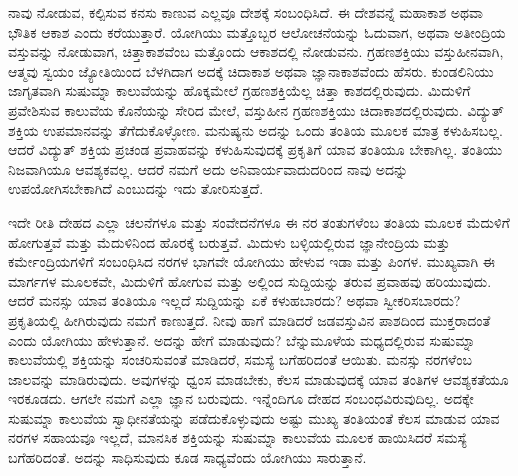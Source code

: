 \vskip 6pt

ನಾವು ನೋಡುವ, ಕಲ್ಪಿಸುವ ಕನಸು ಕಾಣುವ ಎಲ್ಲವೂ ದೇಶಕ್ಕೆ ಸಂಬಂಧಿಸಿದೆ. ಈ ದೇಶವನ್ನೆ ಮಹಾಕಾಶ ಅಥವಾ ಭೌತಿಕ ಆಕಾಶ ಎಂದು ಕರೆಯುತ್ತಾರೆ. ಯೋಗಿಯು ಮತ್ತೊಬ್ಬರ ಆಲೋಚನೆಯನ್ನು ಓದುವಾಗ, ಅಥವಾ ಅತೀಂದ್ರಿಯ ವಸ್ತುವನ್ನು ನೋಡುವಾಗ, ಚಿತ್ತಾಕಾಶವೆಂಬ ಮತ್ತೊಂದು ಆಕಾಶದಲ್ಲಿ ನೋಡುವನು. ಗ್ರಹಣಶಕ್ತಿಯು ವಸ್ತುಹೀನವಾಗಿ, ಆತ್ಮವು ಸ್ವಯಂ ಜ್ಯೋತಿಯಿಂದ ಬೆಳಗಿದಾಗ ಅದಕ್ಕೆ ಚಿದಾಕಾಶ ಅಥವಾ ಜ್ಞಾನಾಕಾಶವೆಂದು ಹೆಸರು. ಕುಂಡಲಿನಿಯು ಜಾಗೃತವಾಗಿ ಸುಷುಮ್ನಾ ಕಾಲುವೆಯನ್ನು ಹೊಕ್ಕಮೇಲೆ ಗ್ರಹಣಶಕ್ತಿಯೆಲ್ಲ ಚಿತ್ತಾ ಕಾಶದಲ್ಲಿರುವುದು. ಮಿದುಳಿಗೆ ಪ್ರವೇಶಿಸುವ ಕಾಲುವೆಯ ಕೊನೆಯನ್ನು ಸೇರಿದ ಮೇಲೆ, ವಸ್ತುಹೀನ ಗ್ರಹಣಶಕ್ತಿಯು  ಚಿದಾಕಾಶದಲ್ಲಿರುವುದು. ವಿದ್ಯುತ್​ಶಕ್ತಿಯ ಉಪಮಾನವನ್ನು ತೆಗೆದುಕೊಳ್ಳೋಣ. ಮನುಷ್ಯನು ಅದನ್ನು ಒಂದು ತಂತಿಯ ಮೂಲಕ ಮಾತ್ರ ಕಳುಹಿಸಬಲ್ಲ. ಆದರೆ ವಿದ್ಯುತ್​ ಶಕ್ತಿಯ ಪ್ರಚಂಡ ಪ್ರವಾಹವನ್ನು ಕಳುಹಿಸುವುದಕ್ಕೆ ಪ್ರಕೃತಿಗೆ ಯಾವ ತಂತಿಯೂ ಬೇಕಾಗಿಲ್ಲ. ತಂತಿಯು ನಿಜವಾಗಿಯೂ ಆವಶ್ಯಕವಲ್ಲ. ಆದರೆ ನಮಗೆ ಅದು ಅನಿವಾರ್ಯವಾದುದರಿಂದ ನಾವು ಅದನ್ನು ಉಪಯೋಗಿಸಬೇಕಾಗಿದೆ ಎಂಬುದನ್ನು ಇದು ತೋರಿಸುತ್ತದೆ. 

\vskip 6pt

ಇದೇ ರೀತಿ ದೇಹದ ಎಲ್ಲಾ ಚಲನೆಗಳೂ ಮತ್ತು ಸಂವೇದನೆಗಳೂ ಈ ನರ ತಂತುಗಳೆಂಬ ತಂತಿಯ ಮೂಲಕ ಮೆದುಳಿಗೆ ಹೋಗುತ್ತವೆ ಮತ್ತು ಮೆದುಳಿನಿಂದ ಹೊರಕ್ಕೆ ಬರುತ್ತವೆ. ಮಿದುಳು ಬಳ್ಳಿಯಲ್ಲಿರುವ ಜ್ಞಾನೇಂದ್ರಿಯ ಮತ್ತು ಕರ್ಮೇಂದ್ರಿಯಗಳಿಗೆ ಸಂಬಂಧಿಸಿದ ನರಗಳ ಭಾಗವೇ ಯೋಗಿಯು ಹೇಳುವ ಇಡಾ ಮತ್ತು ಪಿಂಗಳ. ಮುಖ್ಯವಾಗಿ ಈ ಮಾರ್ಗಗಳ ಮೂಲಕವೇ, ಮಿದುಳಿಗೆ ಹೋಗುವ ಮತ್ತು ಅಲ್ಲಿಂದ ಸುದ್ದಿಯನ್ನು ತರುವ ಪ್ರವಾಹವು ಹರಿಯುವುದು. ಆದರೆ ಮನಸ್ಸು ಯಾವ ತಂತಿಯೂ ಇಲ್ಲದೆ ಸುದ್ದಿಯನ್ನು ಏಕೆ ಕಳುಹಬಾರದು? ಅಥವಾ ಸ್ವೀಕರಿಸಬಾರದು? ಪ್ರಕೃತಿಯಲ್ಲಿ ಹೀಗಿರುವುದು ನಮಗೆ ಕಾಣುತ್ತದೆ. ನೀವು ಹಾಗೆ ಮಾಡಿದರೆ ಜಡವಸ್ತುವಿನ ಪಾಶದಿಂದ ಮುಕ್ತರಾದಂತೆ ಎಂದು ಯೋಗಿಯು ಹೇಳುತ್ತಾನೆ. ಅದನ್ನು ಹೇಗೆ ಮಾಡುವುದು? ಬೆನ್ನುಮೂಳೆಯ ಮಧ್ಯದಲ್ಲಿರುವ ಸುಷುಮ್ನಾ ಕಾಲುವೆಯಲ್ಲಿ ಶಕ್ತಿಯನ್ನು ಸಂಚರಿಸುವಂತೆ ಮಾಡಿದರೆ, ಸಮಸ್ಯೆ ಬಗೆಹರಿದಂತೆ ಆಯಿತು. ಮನಸ್ಸು ನರಗಳೆಂಬ ಜಾಲವನ್ನು ಮಾಡಿರುವುದು. ಅವುಗಳನ್ನು ಧ್ವಂಸ ಮಾಡಬೇಕು, ಕೆಲಸ ಮಾಡುವುದಕ್ಕೆ ಯಾವ ತಂತಿಗಳ ಆವಶ್ಯಕತೆಯೂ ಇರಕೂಡದು. ಆಗಲೇ ನಮಗೆ ಎಲ್ಲಾ ಜ್ಞಾನ ಬರುವುದು. ಇನ್ನೆಂದಿಗೂ ದೇಹದ ಸಂಬಂಧವಿರುವುದಿಲ್ಲ. ಅದಕ್ಕೇ ಸುಷುಮ್ನಾ ಕಾಲುವೆಯ ಸ್ವಾಧೀನತೆಯನ್ನು ಪಡೆದುಕೊಳ್ಳುವುದು ಅಷ್ಟು ಮುಖ್ಯ ತಂತಿಯಂತೆ ಕೆಲಸ ಮಾಡುವ ಯಾವ ನರಗಳ ಸಹಾಯವೂ ಇಲ್ಲದೆ, ಮಾನಸಿಕ ಶಕ್ತಿಯನ್ನು ಸುಷುಮ್ನಾ ಕಾಲುವೆಯ ಮೂಲಕ ಹಾಯಿಸಿದರೆ ಸಮಸ್ಯೆ ಬಗೆಹರಿದಂತೆ. ಅದನ್ನು ಸಾಧಿಸುವುದು ಕೂಡ ಸಾಧ್ಯವೆಂದು ಯೋಗಿಯು ಸಾರುತ್ತಾನೆ. 

\vskip 6pt

